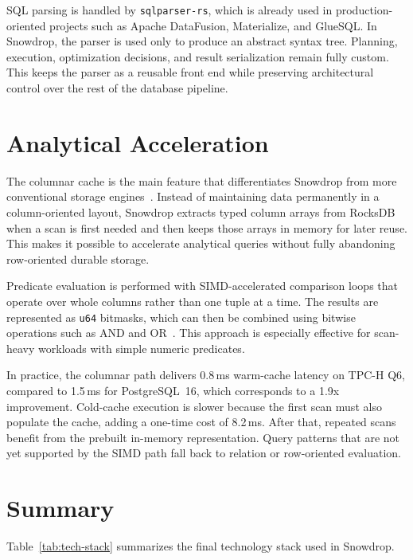 SQL parsing is handled by \texttt{sqlparser-rs}, which is already used in production-oriented projects such as Apache DataFusion, Materialize, and GlueSQL. In Snowdrop, the parser is used only to produce an abstract syntax tree. Planning, execution, optimization decisions, and result serialization remain fully custom. This keeps the parser as a reusable front end while preserving architectural control over the rest of the database pipeline.

\section{Analytical Acceleration}

The columnar cache is the main feature that differentiates Snowdrop from more conventional storage engines~\cite{abadi2013}. Instead of maintaining data permanently in a column-oriented layout, Snowdrop extracts typed column arrays from RocksDB when a scan is first needed and then keeps those arrays in memory for later reuse. This makes it possible to accelerate analytical queries without fully abandoning row-oriented durable storage.

Predicate evaluation is performed with SIMD-accelerated comparison loops that operate over whole columns rather than one tuple at a time. The results are represented as \texttt{u64} bitmasks, which can then be combined using bitwise operations such as AND and OR~\cite{zhou2002}. This approach is especially effective for scan-heavy workloads with simple numeric predicates.

In practice, the columnar path delivers 0.8\,ms warm-cache latency on TPC-H Q6, compared to 1.5\,ms for PostgreSQL~16, which corresponds to a 1.9x improvement. Cold-cache execution is slower because the first scan must also populate the cache, adding a one-time cost of 8.2\,ms. After that, repeated scans benefit from the prebuilt in-memory representation. Query patterns that are not yet supported by the SIMD path fall back to relation or row-oriented evaluation.

\section{Summary}

Table~\ref{tab:tech-stack} summarizes the final technology stack used in Snowdrop.

